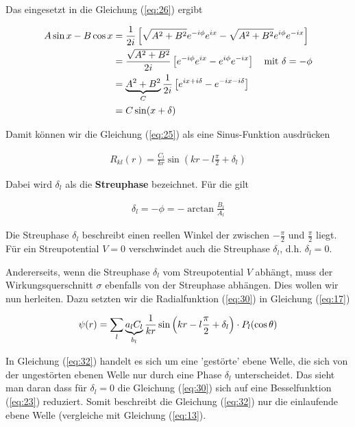 Das eingesetzt in die Gleichung (\ref{eq:26}) ergibt

\begin{align}
  \label{eq:29}
   A\sin x - B\cos x &= \frac{1}{2i} \left[ \sqrt{A^2+B^2}e^{-i\phi}e^{ix}- \sqrt{A^2+B^2}e^{i\phi} e^{-ix}\right]\notag\\
&=\frac{\sqrt{A^2+B^2}}{2i} \left[ e^{-i\phi}e^{ix}- e^{i\phi} e^{-ix}\right] \quad\text{mit }\delta = -\phi\notag\\
&=\underbr{A^2+B^2}_{C}\frac{1}{2i} \left[ e^{ix+i\delta}- e^{-ix-i\delta}\right] \notag\\
&=C \sin(x+\delta)
\end{align}

Damit können wir die Gleichung (\ref{eq:25}) als eine Sinus-Funktion ausdrücken

\begin{align}
  \label{eq:30}
  R_{kl}(r) = \frac{C_l}{kr}  \sin\left(kr-l\frac{\pi}{2} + \delta_l\right)
\end{align}

Dabei wird \(\delta_l\) als die \textbf{Streuphase} bezeichnet. Für die gilt

\begin{align}
  \label{eq:31}
  \delta_l = - \phi = - \arctan \frac{B_l}{A_l}
\end{align}

Die Streuphase \(\delta_l\) beschreibt einen reellen Winkel der zwischen \(-\frac{\pi}{2}\) und \(\frac{\pi}{2}\) liegt. Für ein Streupotential \(V=0\) verschwindet auch die Streuphase \(\delta_l\), d.h. \(\delta_l=0\).

Andererseits, wenn die Streuphase \(\delta_l\) vom Streupotential \(V\) abhängt, muss der Wirkungsquerschnitt \(\sigma\) ebenfalls von der Streuphase abhängen. Dies wollen wir nun herleiten. Dazu setzten wir die Radialfunktion (\ref{eq:30}) in Gleichung (\ref{eq:17})

\begin{align}
  \label{eq:32}
  \psi(r) = \sum_l \underbr{a_{l}C_l}_{b_l} \frac{1}{kr}  \sin\left(kr-l\frac{\pi}{2} + \delta_l\right)  \cdot P_{l}(\cos\theta)
\end{align}

In Gleichung (\ref{eq:32}) handelt es sich um eine 'gestörte' ebene Welle, die sich von der ungestörten ebenen Welle nur durch eine Phase \(\delta_l\) unterscheidet. Das sieht man daran dass für \(\delta_l=0\) die Gleichung (\ref{eq:30}) sich auf eine Besselfunktion (\ref{eq:23})  reduziert. Somit beschreibt die Gleichung (\ref{eq:32}) nur die einlaufende ebene Welle (vergleiche mit Gleichung (\ref{eq:13}).

